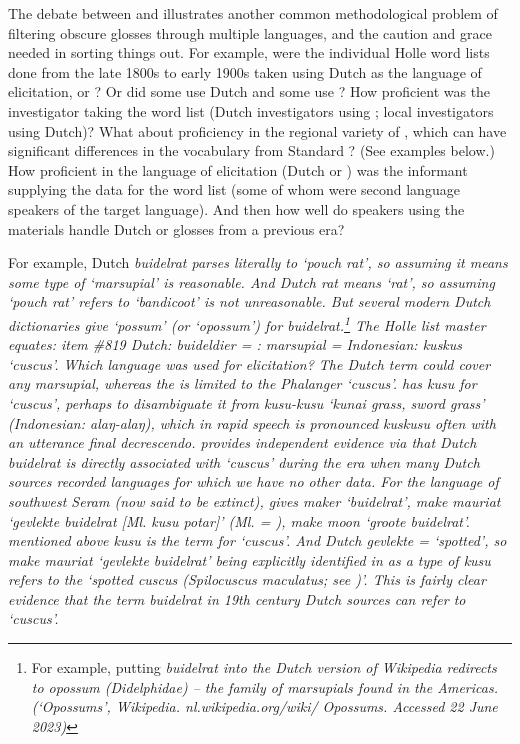 The debate between \citeauthor{Blust2012b}
and \citeauthor{Schapper2011} illustrates another common methodological problem
of filtering obscure glosses through multiple languages,
and the caution and grace needed in sorting things out.
For example, were the individual Holle word lists done from the
late 1800s to early 1900s taken using Dutch as the language of
elicitation, or ? Or did some use Dutch
and some use ? How proficient was the investigator taking
the word list (Dutch investigators using ; local investigators
using Dutch)? What about proficiency in the regional variety
of , which can have significant differences in the vocabulary from
Standard ? (See examples below.) How proficient in the language
of elicitation (Dutch or ) was the informant supplying the
data for the word list (some of whom were second language speakers
of the target language).
And then how well do  speakers using the materials handle
Dutch or  glosses from a previous era?

For example, Dutch \it{buidelrat} parses literally to ‘pouch
rat’, so assuming it means some type of ‘marsupial’ is reasonable.
And Dutch \it{rat} means ‘rat’,
so assuming ‘pouch rat’ refers to ‘bandicoot’ is not unreasonable.
But several modern Dutch dictionaries give ‘possum’ (or ‘opossum’)
for \it{buidelrat}.\footnote{
		For example, putting \it{buidelrat} into the Dutch version of Wikipedia redirects
		to opossum (\it{Didelphidae}) -- the family of marsupials found
		in the Americas. (‘Opossums’, Wikipedia.
		nl.wikipedia.org/wiki/ Opossums. Accessed 22 June 2023)}
The Holle list master \citep[50]{Stokhof1980a} equates: item {\#}819
Dutch: \it{buideldier} = : \it{marsupial} = Indonesian: \it{kuskus} ‘cuscus’.
Which language was used for elicitation? The Dutch term could
cover any marsupial, whereas the  is limited to the \it{Phalanger} ‘cuscus’.
  has \it{kusu} for ‘cuscus’,
perhaps to disambiguate it from \it{kusu-kusu} ‘kunai grass,
sword grass’ (Indonesian: \it{alaŋ-alaŋ}),
which in rapid speech is pronounced \it{kuskusu}
often with an utterance final decrescendo.
\citet[304f]{vanEkris1864} provides independent evidence via 
that Dutch \it{buidelrat} is directly associated with ‘cuscus’
during the era when many Dutch sources recorded languages for
which we have no other data.
For the  language of southwest Seram (now said to be
extinct), \citeauthor{vanEkris1864} gives \it{maker} ‘buidelrat’,
\it{make mauriat} ‘gevlekte buidelrat [Ml.
kusu potar]’ (Ml. = ), \it{make moon} ‘groote buidelrat’.
 mentioned above \it{kusu} is the   term for ‘cuscus’.
And Dutch \it{gevlekte} = ‘spotted’,
so \it{make mauriat} ‘gevlekte buidelrat’ being explicitly identified
in  as a type of \it{kusu} refers to the ‘spotted cuscus
(\it{Spilocuscus maculatus}; see )’.
This is fairly clear evidence that the term \it{buidelrat} in
19th century Dutch sources can refer to ‘cuscus’.

